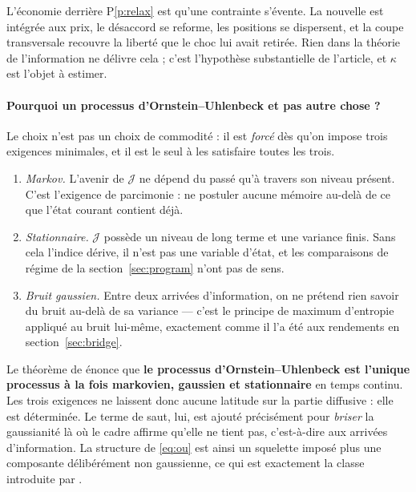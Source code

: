 \documentclass[11pt]{article}
\theoremstyle{definition}
\theoremstyle{remark}
\newcommand{\JJ}{\mathcal{J}}
\begin{document}
L'économie derrière P\ref{p:relax} est qu'une contrainte s'évente. La nouvelle
est intégrée aux prix, le désaccord se reforme, les positions se dispersent, et
la coupe transversale recouvre la liberté que le choc lui avait retirée. Rien
dans la théorie de l'information ne délivre cela ; c'est l'hypothèse substantielle
de l'article, et $\kappa$ est l'objet à estimer.

\paragraph{Pourquoi un processus d'Ornstein--Uhlenbeck et pas autre chose ?}
Le choix n'est pas un choix de commodité : il est \emph{forcé} dès qu'on impose
trois exigences minimales, et il est le seul à les satisfaire toutes les trois.

\begin{enumerate}
\item \emph{Markov.} L'avenir de $\JJ$ ne dépend du passé qu'à travers son
niveau présent. C'est l'exigence de parcimonie : ne postuler aucune mémoire
au-delà de ce que l'état courant contient déjà.
\item \emph{Stationnaire.} $\JJ$ possède un niveau de long terme et une variance
finis. Sans cela l'indice dérive, il n'est pas une variable d'état, et les
comparaisons de régime de la section~\ref{sec:program} n'ont pas de sens.
\item \emph{Bruit gaussien.} Entre deux arrivées d'information, on ne prétend
rien savoir du bruit au-delà de sa variance --- c'est le principe de maximum
d'entropie appliqué au bruit lui-même, exactement comme il l'a été aux
rendements en section~\ref{sec:bridge}.
\end{enumerate}

Le théorème de \citet{doob1942} énonce que \textbf{le processus d'Ornstein--Uhlenbeck
est l'unique processus à la fois markovien, gaussien et stationnaire} en temps
continu. Les trois exigences ne laissent donc aucune latitude sur la partie
diffusive : elle est déterminée. Le terme de saut, lui, est ajouté précisément
pour \emph{briser} la gaussianité là où le cadre affirme qu'elle ne tient pas,
c'est-à-dire aux arrivées d'information. La structure de \eqref{eq:ou} est ainsi
un squelette imposé plus une composante délibérément non gaussienne, ce qui est
exactement la classe introduite par \citet{bns2001}.
\end{document}
